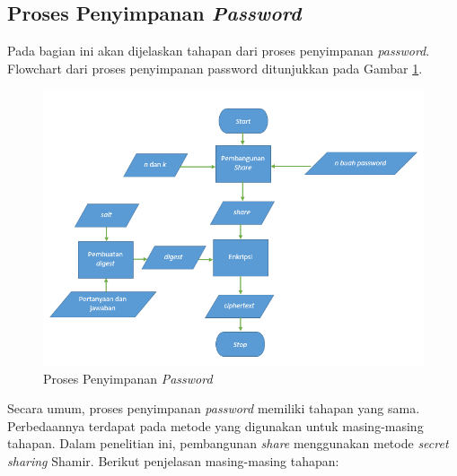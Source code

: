 \subsection{Proses Penyimpanan \textit{Password}}

Pada bagian ini akan dijelaskan tahapan dari proses penyimpanan \textit{password}. Flowchart dari proses penyimpanan password ditunjukkan pada Gambar \ref{fig:create_share}.

\begin{figure}[H]
	\centerline{\includegraphics[scale=0.7]{Gambar/flowchart_share}}
	\caption{Proses Penyimpanan \textit{Password}}\label{fig:create_share}
\end{figure}

Secara umum, proses penyimpanan \textit{password} memiliki tahapan yang sama. Perbedaannya terdapat pada metode yang digunakan untuk masing-masing tahapan. Dalam penelitian ini, pembangunan \textit{share} menggunakan metode \textit{secret sharing} Shamir. Berikut penjelasan masing-masing tahapan:

